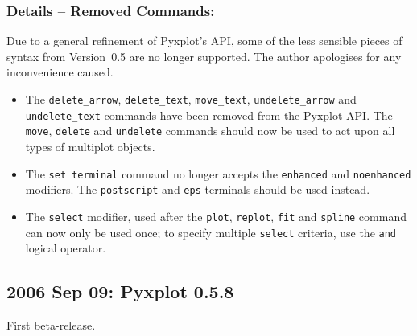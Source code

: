 \subsubsection*{Details -- Removed Commands:}

Due to a general refinement of Pyxplot's API, some of the less sensible pieces
of syntax from Version~0.5 are no longer supported. The author apologises for
any inconvenience caused.

\begin{itemize}
\item The {\tt delete\_arrow}, {\tt delete\_text}, {\tt move\_text}, {\tt undelete\_arrow} and {\tt undelete\_text} commands have been removed from the Pyxplot API. The {\tt move}, {\tt delete} and {\tt undelete} commands should now be used to act upon all types of multiplot objects.
\item The {\tt set terminal} command no longer accepts the {\tt enhanced} and {\tt noenhanced} modifiers. The {\tt postscript} and {\tt eps} terminals should be used instead.
\item The {\tt select} modifier, used after the {\tt plot}, {\tt replot}, {\tt fit} and {\tt spline} command can now only be used once; to specify multiple {\tt select} criteria, use the {\tt and} logical operator.
\end{itemize}

\subsection*{2006 Sep 09: Pyxplot 0.5.8}

First beta-release.
